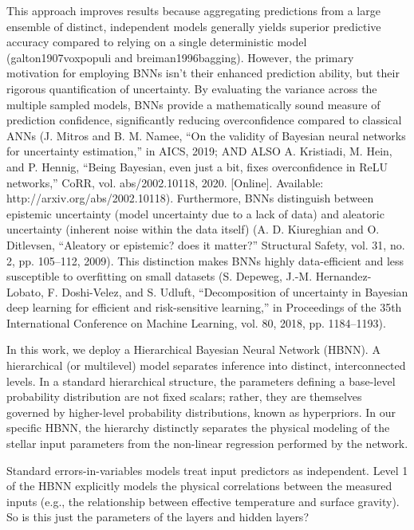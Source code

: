 This approach improves results because aggregating predictions from a large ensemble of distinct, independent models generally yields superior predictive accuracy compared to relying on a single deterministic model (galton1907voxpopuli and breiman1996bagging). However, the primary motivation for employing BNNs isn't their enhanced prediction ability, but their rigorous quantification of uncertainty. By evaluating the variance across the multiple sampled models, BNNs provide a mathematically sound measure of prediction confidence, significantly reducing overconfidence compared to classical ANNs (J. Mitros and B. M. Namee, ``On the validity of Bayesian neural networks for uncertainty estimation,'' in AICS, 2019; AND ALSO A. Kristiadi, M. Hein, and P. Hennig, ``Being Bayesian, even just a bit, fixes overconfidence in ReLU networks,'' CoRR, vol. abs/2002.10118, 2020. [Online]. Available: http://arxiv.org/abs/2002.10118). Furthermore, BNNs distinguish between epistemic uncertainty (model uncertainty due to a lack of data) and aleatoric uncertainty (inherent noise within the data itself) (A. D. Kiureghian and O. Ditlevsen, ``Aleatory or epistemic? does it matter?'' Structural Safety, vol. 31, no. 2, pp. 105–112, 2009). This distinction makes BNNs highly data-efficient and less susceptible to overfitting on small datasets (S. Depeweg, J.-M. Hernandez-Lobato, F. Doshi-Velez, and S. Udluft, ``Decomposition of uncertainty in Bayesian deep learning for efficient and risk-sensitive learning,'' in Proceedings of the 35th International Conference on Machine Learning, vol. 80, 2018, pp. 1184–1193).


In this work, we deploy a Hierarchical Bayesian Neural Network (HBNN). A hierarchical (or multilevel) model separates inference into distinct, interconnected levels. In a standard hierarchical structure, the parameters defining a base-level probability distribution are not fixed scalars; rather, they are themselves governed by higher-level probability distributions, known as hyperpriors. In our specific HBNN, the hierarchy distinctly separates the physical modeling of the stellar input parameters from the non-linear regression performed by the network.


Standard errors-in-variables models treat input predictors as independent. Level 1 of the HBNN explicitly models the physical correlations between the measured inputs (e.g., the relationship between effective temperature and surface gravity). So is this just the parameters of the layers and hidden layers?


